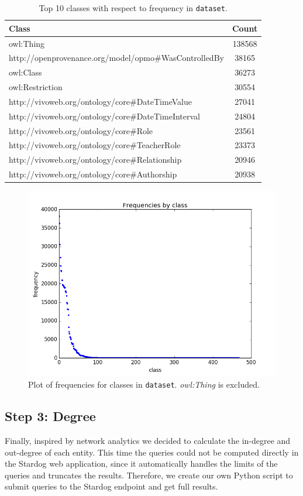 \documentclass[runningheads,a4paper]{../../StyleFiles/llncs}
\begin{document}
\begin{table}[h]
	\begin{center}
		\begin{tabular}{| l | c |}
			\hline
			\textbf{Class} & \textbf{Count} \\ \hline
			owl:Thing &	138568 \\ \hline
			http://openprovenance.org/model/opmo\#WasControlledBy & 38165 \\ \hline
			owl:Class &	36273 \\ \hline
			owl:Restriction	& 30554 \\ \hline
			http://vivoweb.org/ontology/core\#DateTimeValue &	27041 \\ \hline
			http://vivoweb.org/ontology/core\#DateTimeInterval &	24804 \\ \hline
			http://vivoweb.org/ontology/core\#Role &	23561 \\ \hline
			http://vivoweb.org/ontology/core\#TeacherRole &	23373 \\ \hline
			http://vivoweb.org/ontology/core\#Relationship &	20946 \\ \hline
			http://vivoweb.org/ontology/core\#Authorship &	20938 \\ \hline
		\end{tabular}
		\caption{Top 10 classes with respect to frequency in \texttt{dataset}.}
		\label{frequency_table}
	\end{center}
\end{table}

\begin{figure}[h]
	\centering
	\includegraphics[width=.7\textwidth]{img/dataset_frequency.png}
	\caption{Plot of frequencies for classes in \texttt{dataset}. \textit{owl:Thing} is excluded.}
	\label{fig:frequency}
\end{figure}

\subsection{Step 3: Degree}
Finally, inspired by network analytics we decided to calculate the in-degree and out-degree of each entity. This time the queries could not be computed directly in the Stardog web application, since it automatically handles the limits of the queries and truncates the results. Therefore, we create our own Python script to submit queries to the Stardog endpoint and get full results. 
\end{document}
